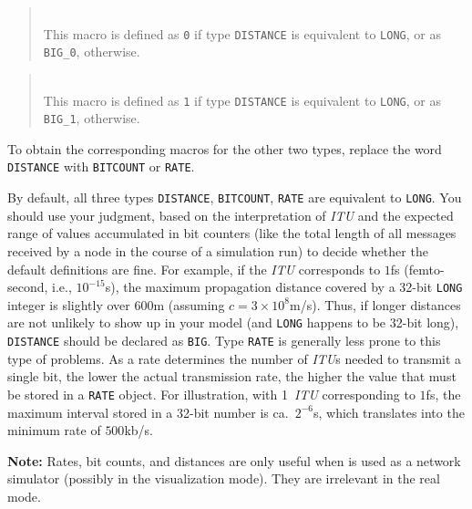 \begin{quote}
\noindent{}\\ \hspace{0in}
This macro is defined as {\tt 0} if type {\tt DISTANCE} is equivalent to
{\tt LONG}, or as {\tt BIG\_0}, otherwise.
\end{quote}

\begin{quote}
\noindent{}\\ \hspace{0in}
This macro is defined as {\tt 1} if type {\tt DISTANCE} is equivalent to
{\tt LONG}, or as {\tt BIG\_1}, otherwise.
\end{quote}\medskip

To obtain the corresponding macros for the other two types, replace
the word {\tt DISTANCE} with {\tt BITCOUNT} or {\tt RATE}.

By default, all three types {\tt DISTANCE}, {\tt BITCOUNT}, {\tt RATE} are
equivalent to {\tt LONG}.
You should use your judgment, based on the interpretation of {\em ITU\/} and the
expected range of values accumulated in bit counters (like the total length
of all messages received by a node in the course of a simulation run) to 
decide whether the default definitions are fine.
For example, if the {\em ITU\/} corresponds to $1$fs (femto-second, i.e.,
$10^{-15}$s), the
maximum propagation distance covered by a 32-bit {\tt LONG} integer is
slightly over $600$m (assuming $c = 3 \times 10^8$m/s).
Thus, if longer distances are not unlikely to show up in your model (and
{\tt LONG} happens to be 32-bit long), {\tt DISTANCE} should be declared
as {\tt BIG}.
Type {\tt RATE} is generally less prone to this type of problems.
As a rate determines the number of {\em ITU\/}s needed to transmit a single
bit, the lower the actual transmission rate, the higher the value that must
be stored in a {\tt RATE} object.
For illustration,
with 1~{\em ITU\/} corresponding to $1$fs, the maximum interval stored
in a 32-bit number is ca.\ $2^{-6}$s, which translates into the minimum
rate of $500$kb/s.

\medskip

\noindent
{\bf Note:} Rates, bit counts, and distances are only useful when {\smurph}
is used as a network simulator (possibly in the visualization mode).
They are irrelevant in the real mode.

\medskip

